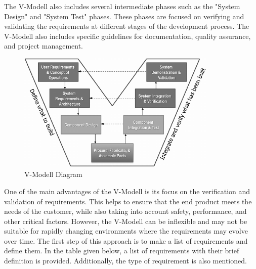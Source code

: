 The V-Modell also includes several intermediate phases such as the "System Design" and "System Test" phases. These phases are focused on verifying and validating the requirements at different stages of the development process. The V-Modell also includes specific guidelines for documentation, quality assurance, and project management.

\begin{figure}[!h]
    	\centering
    	\includegraphics[width= 0.85\textwidth]{images/Typical-systems-engineering-V-model.png}
    	\caption [V-Modell]{V-Modell Diagram \protect\cite{vmodel}}  
    	\label{fig:V-Modell}
\end{figure}

One of the main advantages of the V-Modell is its focus on the verification and validation of requirements. This helps to ensure that the end product meets the needs of the customer, while also taking into account safety, performance, and other critical factors. However, the V-Modell can be inflexible and may not be suitable for rapidly changing environments where the requirements may evolve over time.
The first step of this approach is to make a list of requirements and define them. In the table given below, a list of requirements with their brief definition is provided. Additionally, the type of requirement is also mentioned. 


